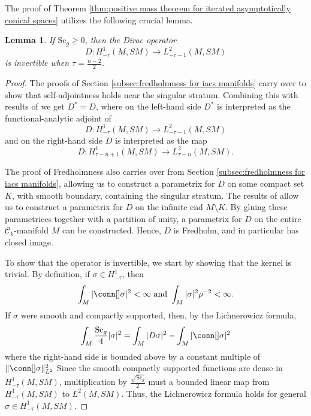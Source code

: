 \documentclass[12pt, reqno]{amsart}
\theoremstyle{plain} %
\newtheorem{lemma}[theorem]{Lemma}
\theoremstyle{definition}
\theoremstyle{remark}
\numberwithin{equation}{section}
\newcommand{\norm}[1]{\lVert #1 \rVert}
\newcommand{\pnorm}[1]{| #1 |}
\newcommand{\cat}[1]{\mathcal{#1}}
\newcommand{\Sc}{\mathrm{Sc}}
\begin{document}
The proof of Theorem \ref{thm:positive mass theorem for iterated asymptotically conical spaces} utilizes the following crucial lemma.
\begin{lemma}\label{lem:invertibility of dirac operator}
    If \(\Sc_g \geq 0\), then the Dirac operator
    \begin{equation*}
        D \colon H_{-\tau}^1(M, SM) \to L_{-\tau-1}^2(M, SM)
    \end{equation*}
    is invertible when \(\tau = \frac{n-2}{2}\).
\end{lemma}
\begin{proof}
    The proofs of Section \ref{subsec:fredholmness for iacs manifolds} carry over to show that self-adjointness holds near the singular stratum.
    Combining this with results of \cite{Bartnik:1986} we get \(D^* = D\), where on the left-hand side \(D^*\) is interpreted as the functional-analytic adjoint of
    \begin{equation*}
        D \colon H_{-\tau}^1(M, SM) \to L_{-\tau-1}^2(M, SM)
    \end{equation*}
    and on the right-hand side \(D\) is interpreted as the map
        \begin{equation*}
        D \colon H_{\tau-n+1}^1(M, SM) \to L_{\tau-n}^2(M, SM).
    \end{equation*}

    The proof of Fredholmness also carries over from Section \ref{subsec:fredholmness for iacs manifolds}, allowing us to construct a parametrix for \(D\) on some compact set \(K\), with smooth boundary, containing the singular stratum.
    The results of \cite{Bartnik:1986} allow us to construct a parametrix for \(D\) on the infinite end \(M \setminus K\).
    By gluing these parametrices together with a partition of unity, a parametrix for \(D\) on the entire \(\cat{C}_k\)-manifold \(M\) can be constructed.
    Hence, \(D\) is Fredholm, and in particular has closed image.

    To show that the operator is invertible, we start by showing that the kernel is trivial.
    By definition, if \(\sigma \in H_{-\tau}^1\), then
    \begin{equation*}
        \int_M \pnorm{\conn[] \sigma}^2 < \infty \text{ and } \int_M \pnorm{\sigma}^2 \rho^{-2} < \infty.
    \end{equation*}
    If \(\sigma\) were smooth and compactly supported, then, by the Lichnerowicz formula,
    \begin{equation*}
        \int_M \frac{\Sc_g}{4} \pnorm{\sigma}^2 = \int_M \pnorm{D\sigma}^2 - \int_M \pnorm{\conn[] \sigma}^2
    \end{equation*}
    where the right-hand side is bounded above by a constant multiple of \(\norm{\conn[] \sigma}_{L^2}^2\)
    Since the smooth compactly supported functions are dense in \(H_{-\tau}^1(M, SM)\), multiplication by \(\frac{\sqrt{\Sc_g}}{2}\) must a bounded linear map from \(H_{-\tau}^1(M, SM)\) to \(L^2(M, SM)\).
    Thus, the Lichnerowicz formula holds for general \(\sigma \in H_{-\tau}^1(M, SM)\).


\end{proof}
\end{document}
